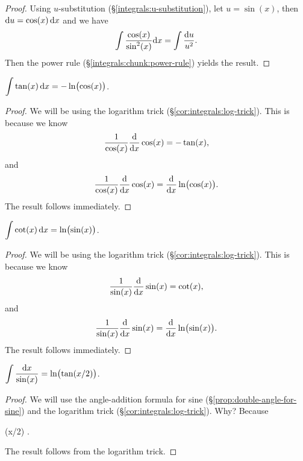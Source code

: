 \begin{proof}
Using $u$-substitution (\S\ref{integrals:u-substitution}),
let $u=\sin(x)$, then $\mathrm{d} u=\cos(x)\,\mathrm{d} x$ and we have
\begin{equation}
\int \frac{\cos(x)}{\sin^{2}(x)}\mathrm{d} x=\int\frac{\mathrm{d} u}{u^{2}}.
\end{equation}
Then the power rule (\S\ref{integrals:chunk:power-rule}) yields the result.
\end{proof}

\M $\displaystyle{\int \tan(x)\,\mathrm{d}x = -\ln\bigl(\cos(x)\bigr)}$.

\begin{proof}
We will be using the logarithm trick (\S\ref{cor:integrals:log-trick}).
This is because we know
\begin{equation}
\frac{1}{\cos(x)}\frac{\mathrm{d}}{\mathrm{d} x}\cos(x) = -\tan(x),
\end{equation}
and
\begin{equation}
\frac{1}{\cos(x)}\frac{\mathrm{d}}{\mathrm{d} x}\cos(x) = \frac{\mathrm{d}}{\mathrm{d} x}\ln\bigl(\cos(x)\bigr).
\end{equation}
The result follows immediately.
\end{proof}

\M $\displaystyle{\int \cot(x)\,\mathrm{d}x = \ln\bigl(\sin(x)\bigr)}$.

\begin{proof}
We will be using the logarithm trick (\S\ref{cor:integrals:log-trick}).
This is because we know
\begin{equation}
\frac{1}{\sin(x)}\frac{\mathrm{d}}{\mathrm{d} x}\sin(x) = \cot(x),
\end{equation}
and
\begin{equation}
\frac{1}{\sin(x)}\frac{\mathrm{d}}{\mathrm{d} x}\sin(x) = \frac{\mathrm{d}}{\mathrm{d} x}\ln\bigl(\sin(x)\bigr).
\end{equation}
The result follows immediately.
\end{proof}

\M $\displaystyle{\int \frac{\mathrm{d}x}{\sin(x)} = \ln\bigl(\tan(x/2)\bigr)}$.

\begin{proof}
We will use the angle-addition formula for sine (\S\ref{prop:double-angle-for-sine})
and the logarithm trick (\S\ref{cor:integrals:log-trick}).
Why? Because
\begin{calculation}
  \tan(x/2)
  .
\end{calculation}
The result follows from the logarithm trick.
\end{proof}

